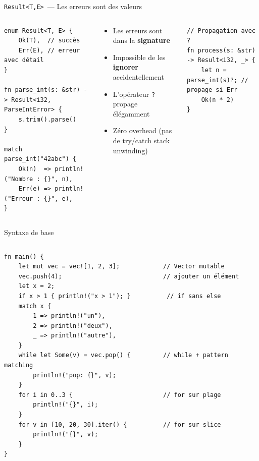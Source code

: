 \documentclass[aspectratio=169, 10pt]{beamer}
\newcommand{\rust}[1]{\texttt{#1}}
\begin{document}
\begin{frame}[fragile]{\texttt{Result<T,E>}~--- Les erreurs sont des valeurs}
  \begin{columns}[t]
    \begin{verbatim}
enum Result<T, E> {
    Ok(T),  // succès
    Err(E), // erreur avec détail
}

fn parse_int(s: &str) -> Result<i32, ParseIntError> {
    s.trim().parse()
}

match parse_int("42abc") {
    Ok(n)  => println!("Nombre : {}", n),
    Err(e) => println!("Erreur : {}", e),
}
    \end{verbatim}

    \begin{tcolorbox}[safebox, title={\faRust\ vs exceptions Java/Python}]
      \small
      \begin{itemize}
        \item Les erreurs sont dans la \textbf{signature}
        \item Impossible de les \textbf{ignorer} accidentellement
        \item L'opérateur \rust{?} propage élégamment
        \item Zéro overhead (pas de try/catch stack unwinding)
      \end{itemize}
    \end{tcolorbox}
    \vspace{0.3em}
    \begin{verbatim}
// Propagation avec ?
fn process(s: &str) -> Result<i32, _> {
    let n = parse_int(s)?; // propage si Err
    Ok(n * 2)
}
    \end{verbatim}
  \end{columns}
\end{frame}

\begin{frame}[fragile]{Syntaxe de base}
  \begin{columns}[t]
    \begin{tcolorbox}[safebox]
      \begin{verbatim}
fn main() {
    let mut vec = vec![1, 2, 3];            // Vector mutable
    vec.push(4);                            // ajouter un élément
    let x = 2;
    if x > 1 { println!("x > 1"); }          // if sans else
    match x {
        1 => println!("un"),
        2 => println!("deux"),
        _ => println!("autre"),
    }
    while let Some(v) = vec.pop() {         // while + pattern matching
        println!("pop: {}", v);
    }
    for i in 0..3 {                         // for sur plage
        println!("{}", i);
    }
    for v in [10, 20, 30].iter() {          // for sur slice
        println!("{}", v);
    }
}
      \end{verbatim}
    \end{tcolorbox}
  \end{columns}
\end{frame}
\end{document}
